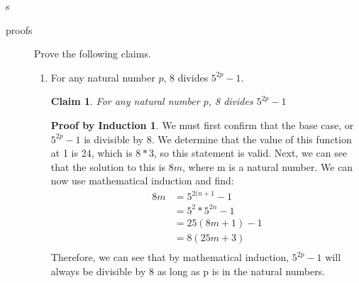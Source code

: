 s\documentclass[11pt]{letter}
\newtheorem{claim}{Claim}
\theoremstyle{definition}
\newtheorem{PBI}{Proof by Induction}
\begin{document}
\begin{description}
\begin{enumerate}
		\end{enumerate}
	\item[proofs] Prove the following claims. 
		\begin{enumerate}
			\item For any natural number $p$, 8 divides $5^{2p}-1$.
\begin{claim}
For any natural number $p$, 8 divides $5^{2p}-1$
\end{claim}
\begin{PBI}
We must first confirm that the base case, or $5^{2p}-1$ is divisible by 8. We determine that the value of this function at 1 is 24, which is $8*3$, so this statement is valid. Next, we can see that the solution to this is $8m$, where m is a natural number. We can now use mathematical induction and find: \\
\begin{align*}
8m &= 5^{2(n+1}-1 \tag{Solving for n+1, since we know that this is true when n is true when n=1} \\
&= 5^2*5^{2n}-1 \\
&=25(8m+1)-1 \\
&=8(25m+3) \\
\end{align*}
Therefore, we can see that by mathematical induction, $5^{2p}-1$ will always be divisible by 8 as long as p is in the natural numbers. \\
\end{PBI}


\end{enumerate}
\end{description}
\end{document}
